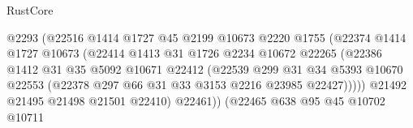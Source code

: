 \begin{lexlean}{RustCore}
\begin{coremodule}
                                    @2293
                                    (@22516
                                      @1414
                                      @1727
                                      @45
                                      @2199
                                      @10673
                                      @2220
                                      @1755
                                      (@22374
                                        @1414
                                        @1727
                                        @10673
                                        (@22414
                                          @1413
                                          @31
                                          @1726
                                          @2234
                                          @10672
                                          @22265
                                          (@22386
                                            @1412
                                            @31
                                            @35
                                            @5092
                                            @10671
                                            @22412
                                            (@22539
                                              @299
                                              @31
                                              @34
                                              @5393
                                              @10670
                                              @22553
                                              (@22378
                                                @297
                                                @66
                                                @31
                                                @33
                                                @3153
                                                @2216
                                                @23985
                                                @22427)))))
                                      @21492
                                      @21495
                                      @21498
                                      @21501
                                      @22410)
                                    @22461))
                                (@22465
                                  @638
                                  @95
                                  @45
                                  @10702
                                  @10711

\end{coremodule}
\end{lexlean}
